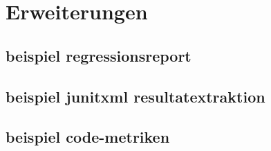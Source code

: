\chapter{Erweiterungen}
\section{beispiel regressionsreport}
\section{beispiel junitxml resultatextraktion}
\section{beispiel code-metriken}
